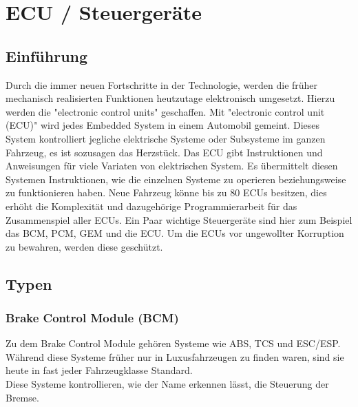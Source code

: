 \section{ECU / Steuergeräte}
    \subsection{Einführung}
    Durch die immer neuen Fortschritte in der Technologie, werden die früher mechanisch realisierten
    Funktionen heutzutage elektronisch umgesetzt. Hierzu werden die "electronic control units"
    geschaffen. Mit "electronic control unit (ECU)" wird jedes Embedded System in einem
    Automobil gemeint. Dieses System kontrolliert jegliche elektrische Systeme
    oder Subsysteme im ganzen Fahrzeug, es ist sozusagen das Herzstück. Das ECU gibt
    Instruktionen und Anweisungen für viele Variaten von elektrischen System. Es übermittelt
    diesen Systemen Instruktionen, wie die einzelnen Systeme zu operieren beziehungsweise
    zu funktionieren haben. Neue Fahrzeug könne bis zu 80 ECUs besitzen, dies erhöht die
    Komplexität und dazugehörige Programmierarbeit für das Zusammenspiel aller ECUs. Ein
    Paar wichtige Steuergeräte sind hier zum Beispiel das BCM, PCM, GEM und die ECU.
    Um die ECUs vor ungewollter Korruption zu bewahren, werden diese geschützt. 

    \subsection{Typen}
        \subsubsection{Brake Control Module (BCM)}
        Zu dem Brake Control Module gehören Systeme wie ABS, TCS und ESC/ESP. Während diese Systeme früher
        nur in Luxusfahrzeugen zu finden waren, sind sie heute in fast jeder Fahrzeugklasse Standard.\\
        Diese Systeme kontrollieren, wie der Name erkennen lässt, die Steuerung der Bremse.

